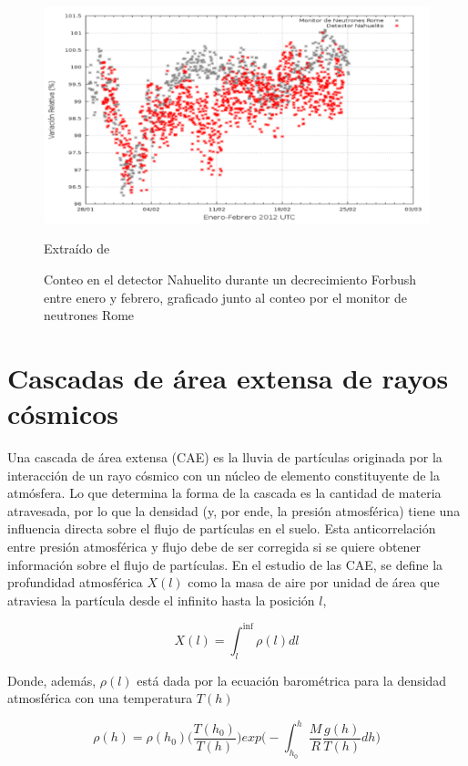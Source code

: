 \documentclass{book}
\begin{document}
\begin{figure}[ht] %
\begin{center}
 \includegraphics[width = 0.7\linewidth]{ForbushYunior.png}
 
 Extra\'ido de \citep{PEREZ}
\caption{Conteo en el detector Nahuelito durante un decrecimiento Forbush entre enero y febrero, graficado junto al conteo por el monitor de neutrones Rome}
\end{center}
\end{figure}

\section{Cascadas de \'area extensa de rayos c\'osmicos}
Una cascada de \'area extensa (CAE) es la lluvia de part\'iculas originada por la interacci\'on de un rayo c\'osmico con un n\'ucleo de elemento constituyente de la atm\'osfera. Lo que determina la forma de la cascada es la cantidad de materia atravesada, por lo que la densidad (y, por ende, la presi\'on atmosf\'erica) tiene una influencia directa sobre el flujo de part\'iculas en el suelo. Esta anticorrelaci\'on entre presi\'on atmosf\'erica y flujo debe de ser corregida si se quiere obtener informaci\'on sobre el flujo de part\'iculas. En el estudio de las CAE, se define la profundidad atmosf\'erica $X(l)$ como la masa de aire por unidad de \'area que atraviesa la part\'icula desde el infinito hasta la posici\'on $l$,

\begin{equation}
X(l)=\int_{l}^{\inf}\rho(l)dl
\end{equation}

Donde, adem\'as, $\rho(l)$ est\'a dada por la ecuaci\'on barom\'etrica para la densidad atmosf\'erica con una temperatura $T(h)$

\begin{equation}
\rho(h)=\rho(h_0)\Bigg(\frac{T(h_0)}{T(h)}\Bigg)exp\Bigg(-\int_{h_0}^{h}\frac{M}{R}\frac{g(h)}{T(h)}dh\Bigg)
\end{equation}
\end{document}
